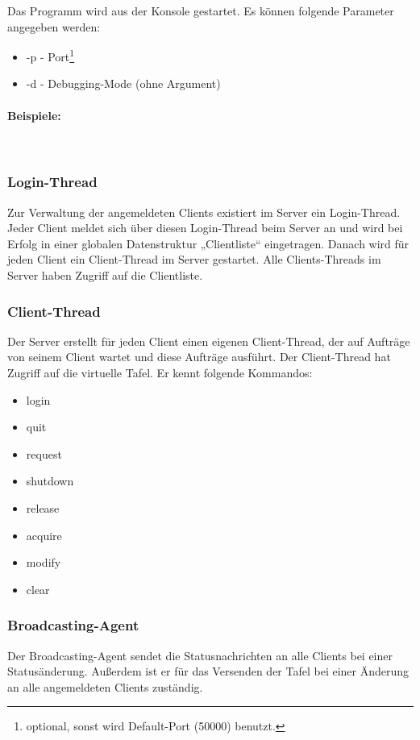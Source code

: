 Das Programm wird aus der Konsole gestartet. Es können folgende Parameter angegeben werden:
\begin{itemize}
 \item -p - Port\footnote{optional, sonst wird Default-Port (50000) benutzt.}
 \item -d - Debugging-Mode (ohne Argument)
\end{itemize}

\paragraph*{Beispiele: \\}
 \\

\subsubsection{Login-Thread}
Zur Verwaltung der angemeldeten Clients existiert im Server ein Login-Thread. Jeder Client meldet sich über 
diesen Login-Thread beim Server an und wird bei Erfolg in einer globalen Datenstruktur „Clientliste“ eingetragen. 
Danach wird für jeden Client ein Client-Thread im Server gestartet. Alle Clients-Threads im Server haben Zugriff 
auf die Clientliste.

\subsubsection{Client-Thread}
Der Server erstellt für jeden Client einen eigenen Client-Thread, der auf Aufträge von seinem Client wartet und 
diese Aufträge ausführt. Der Client-Thread hat Zugriff auf die virtuelle Tafel. Er kennt folgende Kommandos:
\begin{itemize}
 \item login
 \item quit
 \item request
 \item shutdown
 \item release
 \item acquire
 \item modify
 \item clear
\end{itemize}

\subsubsection{Broadcasting-Agent}
Der Broadcasting-Agent sendet die Statusnachrichten an alle Clients bei einer Statusänderung. Außerdem ist er für
das Versenden der Tafel bei einer Änderung an alle angemeldeten Clients zuständig.

